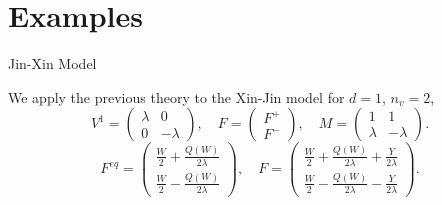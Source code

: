 \documentclass[english]{beamer}
\begin{document}
 \section{Examples}
\begin{frame}{Jin-Xin Model \cite{jin1995relaxation}}

We apply the previous theory to the Xin-Jin model for $d=1$,
$n_{v}=2$,
\[
V^{1}=\left(\begin{array}{cc}
\lambda & 0\\
0 & -\lambda
\end{array}\right),\quad F=\left(\begin{array}{c}
F^{+}\\
F^{-}
\end{array}\right),\quad M=\left(\begin{array}{cc}
1 & 1\\
\lambda & -\lambda
\end{array}\right).
\]
\[
F^{eq}=\left(\begin{array}{c}
\frac{W}{2}+\frac{Q(W)}{2\lambda}\\
\frac{W}{2}-\frac{Q(W)}{2\lambda}
\end{array}\right),\quad F=\left(\begin{array}{c}
\frac{W}{2}+\frac{Q(W)}{2\lambda}+\frac{Y}{2\lambda}\\
\frac{W}{2}-\frac{Q(W)}{2\lambda}-\frac{Y}{2\lambda}
\end{array}\right).
\]

\end{frame}
%
\end{document}
